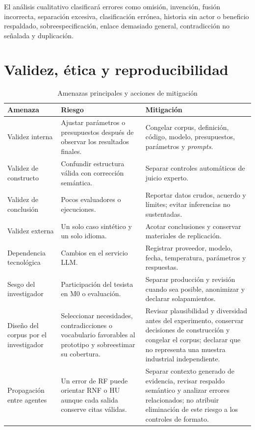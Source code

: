 El análisis cualitativo clasificará errores como omisión, invención, fusión incorrecta, separación excesiva, clasificación errónea, historia sin actor o beneficio respaldado, sobreespecificación, enlace demasiado general, contradicción no señalada y duplicación.

\section{Validez, ética y reproducibilidad}

\begin{table}[H]
  \centering
  \caption{Amenazas principales y acciones de mitigación}
  \label{tab:amenazas}
  \small
  \begin{tabularx}{\textwidth}{p{3.1cm}YY}
    \toprule
    Amenaza & Riesgo & Mitigación \\
    \midrule
    Validez interna & Ajustar parámetros o presupuestos después de observar los resultados finales. & Congelar corpus, definición, código, modelo, presupuestos, parámetros y \emph{prompts}. \\
    Validez de constructo & Confundir estructura válida con corrección semántica. & Separar controles automáticos de juicio experto. \\
    Validez de conclusión & Pocos evaluadores o ejecuciones. & Reportar datos crudos, acuerdo y límites; evitar inferencias no sustentadas. \\
    Validez externa & Un solo caso sintético y un solo idioma. & Acotar conclusiones y conservar materiales de replicación. \\
    Dependencia tecnológica & Cambios en el servicio LLM. & Registrar proveedor, modelo, fecha, temperatura, parámetros y respuestas. \\
    Sesgo del investigador & Participación del tesista en M0 o evaluación. & Separar producción y revisión cuando sea posible, anonimizar y declarar solapamientos. \\
    Diseño del corpus por el investigador & Seleccionar necesidades, contradicciones o vocabulario favorables al prototipo y sobreestimar su cobertura. & Revisar plausibilidad y diversidad antes del experimento, conservar decisiones de construcción y congelar el corpus; declarar que no representa una muestra industrial independiente. \\
    Propagación entre agentes & Un error de RF puede orientar RNF o HU aunque cada salida conserve citas válidas. & Separar contexto generado de evidencia, revisar respaldo semántico y analizar errores relacionados; no atribuir eliminación de este riesgo a los controles de formato. \\
    \bottomrule
  \end{tabularx}
\end{table}


